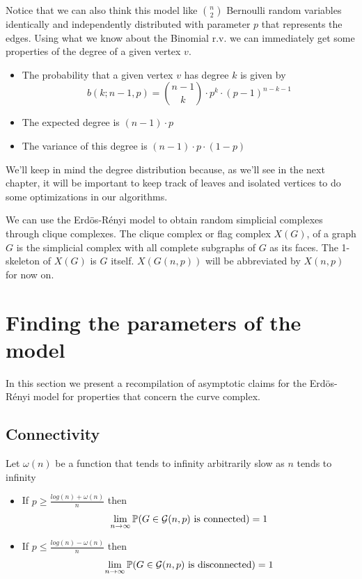 Notice that we can also think this model like $\binom{n}{2}$ Bernoulli random variables identically and independently distributed with parameter $p$ that represents the edges. Using what we know about the Binomial r.v. we can immediately get some properties of the degree of a given vertex $v$. 

\begin{itemize}
\item The probability that a given vertex $v$ has degree $k$ is given by
$$b(k; n-1,p) = \binom{n-1}{k} \cdot p^{k} \cdot (p-1)^{n-k-1}$$
\item The expected degree is $(n-1)\cdot p$
\item The variance of this degree is $(n-1)\cdot p \cdot (1-p)$
\end{itemize}

We'll keep in mind the degree distribution because, as we'll see in the next chapter, it will be important to keep track of leaves and isolated vertices to do some optimizations in our algorithms.

We can use the Erdös-Rényi model to obtain random simplicial complexes through clique complexes. The clique complex or flag complex $X(G)$, of a graph $G$ is the simplicial complex with all complete subgraphs of $G$ as its faces. The 1-skeleton of $X(G)$ is $G$ itself. $X(G(n, p))$ will be abbreviated by $X(n, p)$ for now on.

\section{Finding the parameters of the model}

In this section we present a recompilation of asymptotic claims for the Erdös-Rényi model for properties that concern the curve complex.

\subsection{Connectivity}
\begin{theorem}
Let $\omega(n)$ be a function that tends to infinity arbitrarily slow as $n$ tends to infinity
\begin{itemize}
\item If $p\geq \frac{log(n)+ \omega(n)}{n}$ then 
$$\lim_{n \to \infty} \mathbb{P}(G \in \mathcal{G}(n,p) \text{ is connected}) = 1$$
\item If $p\leq \frac{log(n)- \omega(n)}{n}$ then
$$\lim_{n \to \infty} \mathbb{P}(G \in \mathcal{G}(n,p) \text{ is disconnected}) = 1$$
\end{itemize}
\end{theorem}
 

